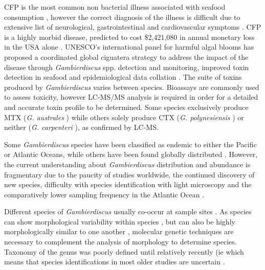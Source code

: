 \documentclass[12pt]{article}
\begin{document}
CFP is the most common non bacterial illness associated with seafood consumption \citep{friedman2008ciguatera}, however the correct diagnosis of the illness is difficult due to extensive list of neurological, gastrointestinal and cardiovascular symptoms \citep{sims1987theoretical}. CFP is a highly morbid disease, predicted to cost \$2,421,080 in annual monetary loss in the USA alone \citep{minor2014per}.  UNESCO's international panel for harmful algal blooms has proposed a coordinated global ciguatera strategy to address the impact of the disease through \emph{Gambierdiscus} spp. detection and monitoring, improved toxin detection in seafood and epidemiological data collation \citep{globalcig}.
The suite of toxins produced by \emph{Gambierdiscus} varies between species. Bioassays are commonly used to assess toxicity, however LC-MS/MS analysis is required in order for a detailed and accurate toxin profile to be determined\citep{diogened2014chemistry}. Some species exclusively produce MTX (\emph{G. australes} \citep{rhodes2014production}) while others solely produce CTX (\emph{G. polynesiensis} \citep{rhodes2014production}) or neither (\emph{G. carpenteri} \citep{kohli2014high}), as confirmed by LC-MS. 

Some \emph{Gambierdiscus} species have been classified as endemic to either the Pacific or Atlantic Oceans, while others have been found globally distributed \citep{berdalet2012global,litaker2010global}. %
However, the current understanding about \emph{Gambierdiscus} distribution and abundance is fragmentary due to the paucity of studies worldwide, the continued discovery of new species, difficulty with species identification with light microscopy and the comparatively lower sampling frequency in the Atlantic Ocean \citep{berdalet2012global,nishimura2014morphology}. 

Different species of \emph{Gambierdiscus} usually co-occur at sample sites \citep{litaker2010global}. As species can show morphological variability within species \citep{bravo2014cellular}, but can also be highly morphologically similar to one another \citep{kohli2014high}, molecular genetic techniques are necessary to complement the analysis of morphology to determine species. Taxonomy of the genus was poorly defined until relatively recently (ie \citep{litaker2009taxonomy,richlen2008phylogeography} which means that species identifications in most older studies are uncertain \citep{berdalet2012global}. %
\end{document}
